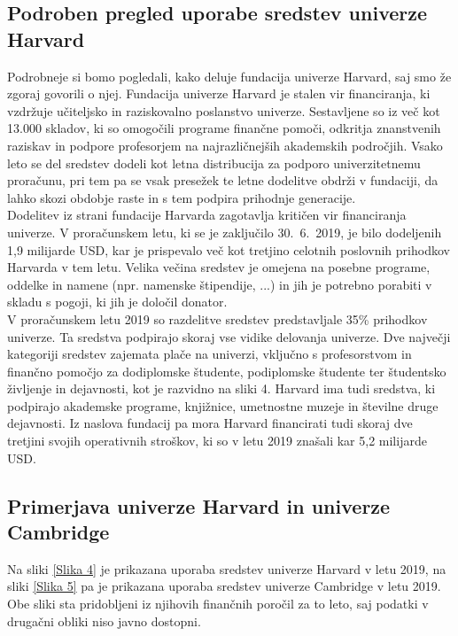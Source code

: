\documentclass[12pt, a4paper]{article}
\begin{document}
\subsection{Podroben pregled uporabe sredstev univerze Harvard}

Podrobneje si bomo pogledali, kako deluje fundacija univerze Harvard, saj smo že zgoraj govorili o njej. Fundacija univerze Harvard je stalen vir financiranja, ki vzdržuje učiteljsko in raziskovalno poslanstvo univerze. Sestavljene so iz več kot 13.000 skladov, ki so omogočili programe finančne pomoči, odkritja znanstvenih raziskav in podpore profesorjem na najrazličnejših akademskih področjih. Vsako leto se del sredstev dodeli kot letna distribucija za podporo univerzitetnemu proračunu, pri tem pa se vsak presežek te letne dodelitve obdrži v fundaciji, da  lahko skozi obdobje raste in s tem podpira prihodnje generacije. \cite{harvard} \\

Dodelitev iz strani fundacije Harvarda zagotavlja kritičen vir financiranja univerze. V proračunskem letu, ki se je zaključilo 30.~6.~2019, je bilo dodeljenih 1,9 milijarde USD, kar je prispevalo več kot tretjino celotnih poslovnih prihodkov Harvarda v tem letu. Velika večina sredstev je omejena na posebne programe, oddelke in namene (npr. namenske štipendije, ...) in jih je potrebno porabiti v skladu s pogoji, ki jih je določil donator. \cite{harvard} \\

V proračunskem letu 2019 so razdelitve sredstev predstavljale 35\% prihodkov univerze. Ta sredstva podpirajo skoraj vse vidike delovanja univerze. Dve največji kategoriji sredstev zajemata plače na univerzi, vključno s profesorstvom in finančno pomočjo za dodiplomske študente, podiplomske študente ter študentsko življenje in dejavnosti, kot je razvidno na sliki 4. Harvard ima tudi sredstva, ki podpirajo akademske programe, knjižnice, umetnostne muzeje in številne druge dejavnosti. Iz naslova fundacij pa mora Harvard financirati tudi skoraj dve tretjini svojih operativnih stroškov, ki so v letu 2019 znašali kar 5,2 milijarde USD. \cite{harvard} 

\subsection{Primerjava univerze Harvard in univerze Cambridge}

Na sliki \ref{Slika 4} je prikazana uporaba sredstev univerze Harvard v letu 2019, na sliki \ref{Slika 5} pa je prikazana uporaba sredstev univerze Cambridge v letu 2019. Obe sliki sta pridobljeni iz njihovih finančnih poročil za to leto, saj podatki v drugačni obliki niso javno dostopni. \\
\end{document}
